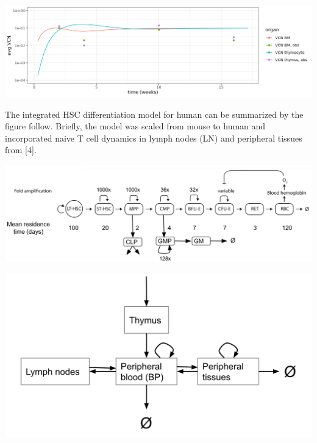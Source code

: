 \documentclass[a0paper,portrait]{baposter}
\begin{document}
\begin{poster}
{\begin{minipage}[b]{0.55\linewidth}
\centering
\includegraphics[width= 0.8 \textwidth]{../img/mouse_adascidgtsimul.png}
\end{minipage}
\hspace{0.5cm}
\begin{minipage}[b]{0.4\linewidth}
\centering
\end{minipage}
	



The integrated HSC differentiation model for human can be summarized by the figure follow. Briefly, the model was scaled from mouse to human and incorporated naive T cell dynamics in lymph nodes (LN) and peripheral tissues from [4].  


\begin{minipage}[b]{0.55\linewidth}
\centering
\includegraphics[width=\textwidth]{../img/human_full_structure.png}
\end{minipage}
\hspace{0.5cm}
\begin{minipage}[b]{0.4\linewidth}
\centering
\includegraphics[width=\textwidth]{../img/human_naiveT.png}
\end{minipage}


}
\end{poster}
\end{document}
